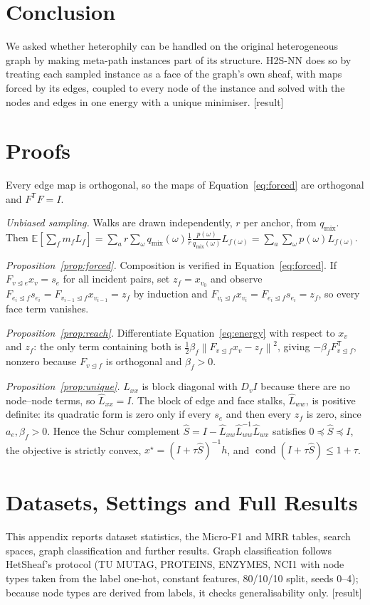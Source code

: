 \documentclass{article}
\newcommand{\method}{\textsc{H2S-NN}}
\newcommand{\norm}[1]{\left\lVert #1\right\rVert}
\newcommand{\transpose}{\mathsf{T}}
\newcommand{\res}{{\scriptsize[result]}}
\newcommand{\inc}{\trianglelefteq}
\begin{document}
\section{Conclusion}
We asked whether heterophily can be handled on the original heterogeneous graph by making meta-path instances part of its structure. \method{} does so by treating each sampled instance as a face of the graph's own sheaf, with maps forced by its edges, coupled to every node of the instance and solved with the nodes and edges in one energy with a unique minimiser. \res{}




\appendix
\section{Proofs}
\label{app:proofs}
Every edge map is orthogonal, so the maps of Equation~\eqref{eq:forced} are orthogonal and $F^{\transpose}F=I$.

\emph{Unbiased sampling.} Walks are drawn independently, $r$ per anchor, from $q_{\mathrm{mix}}$. Then $\mathbb{E}[\sum_fm_fL_f]=\sum_a r\sum_\omega q_{\mathrm{mix}}(\omega)\frac1r\frac{p(\omega)}{q_{\mathrm{mix}}(\omega)}L_{f(\omega)}=\sum_a\sum_\omega p(\omega)L_{f(\omega)}$.

\emph{Proposition~\ref{prop:forced}.} Composition is verified in Equation~\eqref{eq:forced}. If $F_{v\inc e}x_v=s_e$ for all incident pairs, set $z_f=x_{v_0}$ and observe $F_{e_i\inc f}s_{e_i}=F_{v_{i-1}\inc f}x_{v_{i-1}}=z_f$ by induction and $F_{v_i\inc f}x_{v_i}=F_{e_i\inc f}s_{e_i}=z_f$, so every face term vanishes.

\emph{Proposition~\ref{prop:reach}.} Differentiate Equation~\eqref{eq:energy} with respect to $x_v$ and $z_f$: the only term containing both is $\frac12\beta_f\norm{F_{v\inc f}x_v-z_f}^2$, giving $-\beta_fF_{v\inc f}^{\transpose}$, nonzero because $F_{v\inc f}$ is orthogonal and $\beta_f>0$.

\emph{Proposition~\ref{prop:unique}.} $L_{xx}$ is block diagonal with $D_vI$ because there are no node--node terms, so $\hat L_{xx}=I$. The block of edge and face stalks, $\hat L_{ww}$, is positive definite: its quadratic form is zero only if every $s_e$ and then every $z_f$ is zero, since $a_e,\beta_f>0$. Hence the Schur complement $\hat S=I-\hat L_{xw}\hat L_{ww}^{-1}\hat L_{wx}$ satisfies $0\preceq\hat S\preceq I$, the objective is strictly convex, $x^\star=(I+\tau\hat S)^{-1}h$, and $\operatorname{cond}(I+\tau\hat S)\le1+\tau$.

\section{Datasets, Settings and Full Results}
\label{app:data}
This appendix reports dataset statistics, the Micro-F1 and MRR tables, search spaces, graph classification and further results. Graph classification follows HetSheaf's protocol (TU MUTAG, PROTEINS, ENZYMES, NCI1 with node types taken from the label one-hot, constant features, 80/10/10 split, seeds 0--4); because node types are derived from labels, it checks generalisability only. \res{}
\end{document}
